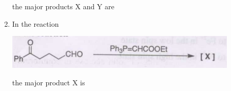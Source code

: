 \documentclass[journal,12pt,onecolumn]{IEEEtran}
\theoremstyle{remark}
\begin{document}
\begin{enumerate}
the major products X and Y are

\begin{enumerate}

\hfill{}

\end{enumerate}



\item In the reaction
    \begin{center}
        \includegraphics[width=0.7\columnwidth]{q12}
      
    \end{center}
    the major product X is
    \begin{enumerate}
    \begin{multicols}{2}
  

\end{multicols}
\end{enumerate}
\end{enumerate}
\end{document}
